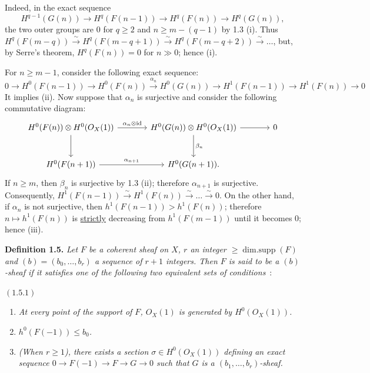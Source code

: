 Indeed, in the exact sequence
\[
H^{q-1}(G(n))\longrightarrow H^q(F(n-1))\longrightarrow H^q(F(n))\longrightarrow H^q(G(n)),
\]
the two outer groups are \(0\) for \(q\ge2\) and \(n\ge m-(q-1)\) by 1.3 (i). Thus \(H^q(F(m-q))\xrightarrow{\sim}H^q(F(m-q+1))\xrightarrow{\sim}H^q(F(m-q+2))\xrightarrow{\sim}\ldots\), but, by Serre's theorem, \(H^q(F(n))=0\) for \(n\gg0\); hence (i).

For \(n\ge m-1\), consider the following exact sequence:
\[
0\to H^0(F(n-1))\to H^0(F(n))
  \xrightarrow{\alpha_n}H^0(G(n))\to H^1(F(n-1))
  \to H^1(F(n))\to0
\]
It implies (ii). Now suppose that \(\alpha_n\) is surjective and consider the following commutative diagram:
\[
\begin{tikzcd}[column sep=large,row sep=large]
H^0(F(n))\otimes H^0({O}_X(1))
  \arrow[r,"\alpha_n\otimes\mathrm{id}"]
  \arrow[d]
& H^0(G(n))\otimes H^0({O}_X(1))
  \arrow[r]
  \arrow[d,"\beta_n"]
& 0 \\
H^0(F(n+1))
  \arrow[r,"\alpha_{n+1}"]
& H^0(G(n+1)).
\end{tikzcd}
\]
%
If \(n\ge m\), then \(\beta_n\) is surjective by 1.3 (ii); therefore \(\alpha_{n+1}\) is surjective. Consequently, \(H^1(F(n-1))\xrightarrow{\sim}H^1(F(n))\xrightarrow{\sim}\ldots\xrightarrow{\sim}0\). On the other hand, if \(\alpha_n\) is not surjective, then \(h^1(F(n-1))>h^1(F(n))\); therefore \(n\mapsto h^1(F(n))\) is \uline{strictly} decreasing from \(h^1(F(m-1))\) until it becomes \(0\); hence (iii).

\textbf{Definition 1.5.} \emph{Let \(F\) be a coherent sheaf on \(X\), \(r\) an integer \(\ge\operatorname{dim{.}supp}(F)\) and \((b)=(b_0,\ldots,b_r)\) a sequence of \(r+1\) integers. Then \(F\) is said to be a \emph{\((b)\)-sheaf} if it satisfies one of the following two equivalent sets of conditions}~:

\((1.5.1)\)
\begin{enumerate}[label=(\roman*)]
\item \emph{At every point of the support of \(F\), \({O}_X(1)\) is generated by \(H^0({O}_X(1))\).}
\item \emph{\(h^0(F(-1))\le b_0\).}
\item \emph{(When \(r\ge1\)), there exists a section \(\sigma\in H^0({O}_X(1))\) defining an exact sequence \(0\to F(-1)\to F\to G\to0\) such that \(G\) is a \((b_1,\ldots,b_r)\)-sheaf.}
\end{enumerate}


